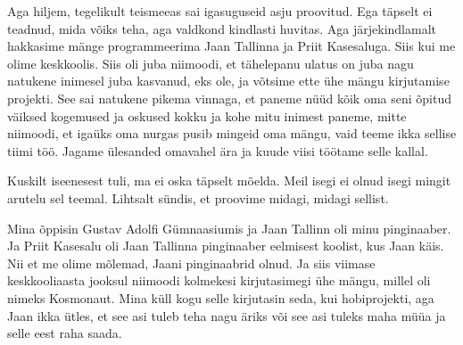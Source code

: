 Aga hiljem, tegelikult teismeeas sai igasuguseid asju proovitud. Ega täpselt ei 
teadnud, mida võiks  teha, aga valdkond kindlasti huvitas. Aga järjekindlamalt 
hakkasime mänge programmeerima Jaan Tallinna ja Priit 
Kasesaluga. Siis kui me olime keskkoolis. Siis oli 
juba niimoodi, et tähelepanu ulatus on juba nagu natukene inimesel juba 
kasvanud, eks ole, ja võtsime ette ühe mängu kirjutamise projekti. See sai 
natukene pikema vinnaga, et paneme nüüd kõik oma seni õpitud väiksed kogemused 
ja oskused kokku ja kohe mitu inimest paneme, mitte niimoodi, et igaüks oma 
nurgas pusib mingeid oma mängu, vaid teeme ikka sellise tiimi töö. Jagame 
ülesanded omavahel ära ja kuude viisi töötame selle kallal. 


Kuskilt iseenesest tuli, ma ei oska täpselt mõelda. Meil isegi ei olnud isegi 
mingit arutelu sel teemal. Lihtsalt sündis, et proovime midagi, midagi sellist. 


Mina õppisin Gustav Adolfi Gümnaasiumis 
ja Jaan Tallinn oli minu pinginaaber. Ja Priit 
Kasesalu oli Jaan Tallinna pinginaaber eelmisest 
koolist, kus Jaan käis. Nii et me olime mõlemad, Jaani pinginaabrid olnud. Ja 
siis viimase keskkooliaasta jooksul niimoodi kolmekesi kirjutasimegi ühe mängu, 
millel oli nimeks Kosmonaut. Mina küll kogu selle 
kirjutasin seda, kui hobiprojekti, aga Jaan ikka ütles, et see asi tuleb teha 
nagu äriks või see asi tuleks maha müüa ja selle eest  raha saada. 


